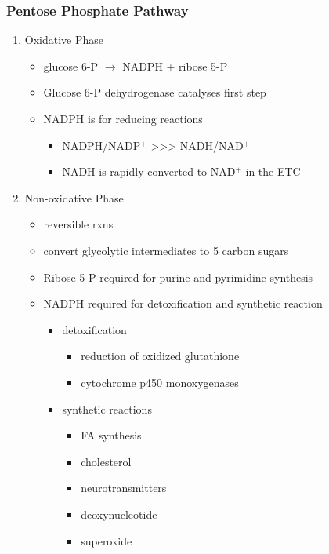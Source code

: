 \documentclass{scrartcl}
\begin{document}
\subsubsection{Pentose Phosphate Pathway}
\label{sec:org1ecd197}
\begin{enumerate}
\item Oxidative Phase
\label{sec:org4a019aa}
\begin{itemize}
\item glucose 6-P \(\to\) NADPH + ribose 5-P
\item Glucose 6-P dehydrogenase catalyses first step
\item NADPH is for reducing reactions
\begin{itemize}
\item NADPH/NADP\(^{\text{+}}\) \textgreater{}\textgreater{}\textgreater{} NADH/NAD\(^{\text{+}}\)
\item NADH is rapidly converted to NAD\(^{\text{+}}\) in the ETC
\end{itemize}
\end{itemize}
\item Non-oxidative Phase
\label{sec:org4da9d11}
\begin{itemize}
\item reversible rxns
\item convert glycolytic intermediates to 5 carbon sugars

\item Ribose-5-P required for purine and pyrimidine synthesis
\item NADPH required for detoxification and synthetic reaction
\begin{itemize}
\item detoxification
\begin{itemize}
\item reduction of oxidized glutathione
\item cytochrome p450 monoxygenases
\end{itemize}
\item synthetic reactions
\begin{itemize}
\item FA synthesis
\item cholesterol
\item neurotransmitters
\item deoxynucleotide
\item superoxide
\end{itemize}
\end{itemize}
\end{itemize}
\end{enumerate}
\end{document}
